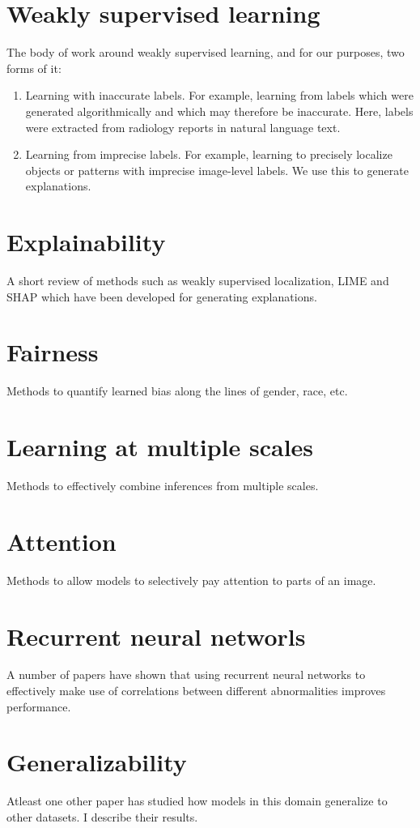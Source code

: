 \documentclass[12pt,twoside,a4paper]{report}
\begin{document}
\section{Weakly supervised learning}
The body of work around weakly supervised learning, and for our purposes, two
forms of it:
\begin{enumerate}
\item{Learning with inaccurate labels. For example, learning from labels which
    were generated algorithmically and which may therefore be inaccurate. Here,
    labels were extracted from radiology reports in natural language text.}
\item{Learning from imprecise labels. For example, learning to precisely
    localize objects or patterns with imprecise image-level labels. We use this
    to generate explanations.}
\end{enumerate}
\section{Explainability}
A short review of methods such as weakly supervised localization, LIME and SHAP
which have been developed for generating explanations.
\section{Fairness}
Methods to quantify learned bias along the lines of gender, race, etc.
\section{Learning at multiple scales}
Methods to effectively combine inferences from multiple scales.
\section{Attention}
Methods to allow models to selectively pay attention to parts of an image.
\section{Recurrent neural networls}
A number of papers have shown that using recurrent neural networks to
effectively make use of correlations between different abnormalities improves
performance.
\section{Generalizability}
Atleast one other paper has studied how models in this domain generalize to
other datasets. I describe their results.
\end{document}
